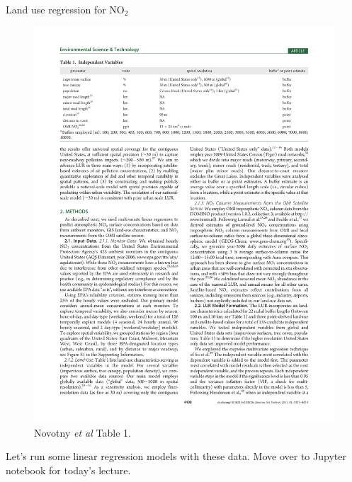 \documentclass[aspectratio=169]{beamer}
\begin{document}
\begin{frame}{Land use regression for NO$_2$}
\begin{figure}
\includegraphics[height=0.6\textheight]{novotny_tab1_4}
\caption*{Novotny \textit{et al} Table 1.  }
\end{figure}

\end{frame}


\begin{frame}{}
	Let's run some linear regression models with these data.  Move over to Jupyter notebook for today's lecture.

\end{frame}

	
\end{document}
